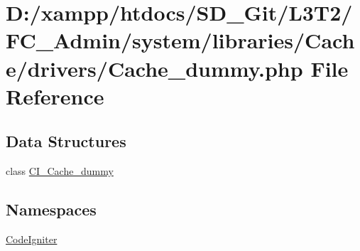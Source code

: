 \hypertarget{_admin_2system_2libraries_2_cache_2drivers_2_cache__dummy_8php}{}\section{D\+:/xampp/htdocs/\+S\+D\+\_\+\+Git/\+L3\+T2/\+F\+C\+\_\+\+Admin/system/libraries/\+Cache/drivers/\+Cache\+\_\+dummy.php File Reference}
\label{_admin_2system_2libraries_2_cache_2drivers_2_cache__dummy_8php}
\subsection*{Data Structures}
\begin{DoxyCompactItemize}
\item 
class \hyperlink{class_c_i___cache__dummy}{C\+I\+\_\+\+Cache\+\_\+dummy}
\end{DoxyCompactItemize}
\subsection*{Namespaces}
\begin{DoxyCompactItemize}
\item 
 \hyperlink{namespace_code_igniter}{Code\+Igniter}
\end{DoxyCompactItemize}
